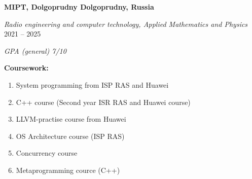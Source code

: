 \textbf{MIPT, Dolgoprudny \hfill Dolgoprudny, Russia} \par
\textit{Radio engineering and computer technology, Applied Mathematics and Physics} \hfill 2021 -- 2025\par
\textit{GPA (general) 7/10} \par
\textbf{Coursework:}
\begin{enumerate}
    \item[$\bullet$] System programming from ISP RAS and Huawei
    \item[$\bullet$] C++ course (Second year ISR RAS and Huawei course)
    \item[$\bullet$] LLVM-practise course from Huawei
    \item[$\bullet$] OS Architecture course (ISP RAS)
    \item[$\bullet$] Concurrency course
    \item[$\bullet$] Metaprogramming cource (C++)
\end{enumerate}
